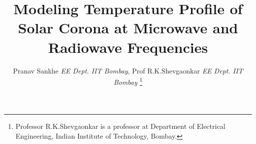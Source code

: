 \documentclass[journal]{IEEEtran}
\begin{document}
%
\title{Modeling Temperature Profile of Solar Corona at Microwave and Radiowave Frequencies}
%
%
%


\author{Pranav Sankhe \emph{EE Dept. IIT Bombay}, Prof R.K.Shevgaonkar \emph{EE Dept. IIT Bombay}
\thanks{Professor R.K.Shevgaonkar is a professor at Department
of Electrical Engineering, Indian Institute of Technology, Bombay.}%
}
% 
%



% 
\end{document}
